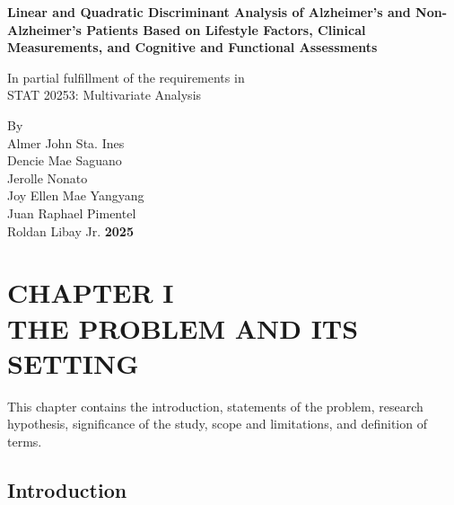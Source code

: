 \documentclass[12pt]{article}
\begin{document}
\begin{titlepage}
    \thispagestyle{fancy}
    \fancyfoot[C]{\textcolor{white}{\thepage}}
    \centering
    \vspace*{2cm}  %
    \textbf{Linear and Quadratic Discriminant Analysis of Alzheimer's and Non-Alzheimer's Patients
    Based on Lifestyle Factors, Clinical Measurements, and Cognitive and Functional Assessments}
    
    \vspace*{4cm} 
    \normalsize
    In partial fulfillment of the requirements in \\ 
    STAT 20253: Multivariate Analysis

    \vspace*{3cm}
    By \\ [0.5 cm]
    Almer John Sta. Ines \\ [0.3 cm]
    Dencie Mae Saguano \\ [0.3 cm]
    Jerolle Nonato \\ [0.3 cm]
    Joy Ellen Mae Yangyang \\ [0.3 cm]
    Juan Raphael Pimentel \\ [0.3 cm]
    Roldan Libay Jr. 
    \vfill
    \textbf{2025}
\end{titlepage}

\renewcommand{\contentsname}{TABLE OF CONTENTS}
\doublespacing
\tableofcontents

\restoregeometry

\setcounter{page}{1}

\newpage

\section{CHAPTER I \\ THE PROBLEM AND ITS SETTING}
\doublespacing
\noindent

This chapter contains the introduction, statements of the problem, research hypothesis, 
significance of the study, scope and limitations, and definition of terms. 

\subsection{Introduction}
\noindent
\end{document}
